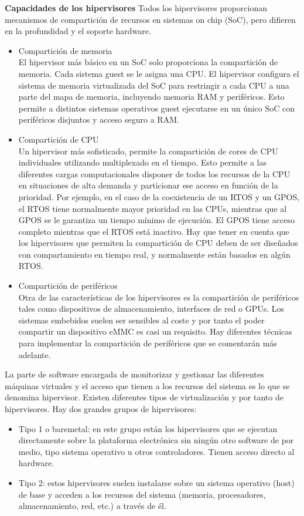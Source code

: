 \textbf{Capacidades de los hipervisores}
Todos los hipervisores proporcionan mecanismos de compartición de recursos en sistemas on chip (SoC), pero difieren en la profundidad y el soporte hardware.
\begin{itemize}
	\item Compartición de memoria\\
	El hipervisor más básico en un SoC solo proporciona la compartición de memoria. Cada sistema guest se le asigna una CPU. El hipervisor configura el sistema de memoria virtualizada del SoC para restringir a cada CPU a una parte del mapa de memoria, incluyendo memoria RAM y periféricos. Esto permite a distintos sistemas operativos guest ejecutarse en un único SoC con periféricos disjuntos y acceso seguro a RAM.
	\item Compartición de CPU\\
	Un hipervisor más sofisticado, permite la compartición de cores de CPU individuales utilizando multiplexado en el tiempo. Esto permite a las diferentes cargas computacionales disponer de todos los recursos de la CPU en situaciones de alta demanda y particionar ese acceso en función de la prioridad. Por ejemplo, en el caso de la coexistencia de un RTOS y un GPOS, el RTOS tiene normalmente mayor prioridad en las CPUs, mientras que al GPOS se le garantiza un tiempo mínimo de ejecución. El GPOS tiene acceso completo mientras que el RTOS está inactivo. Hay que tener en cuenta que los hipervisores que permiten la compartición de CPU deben de ser diseñados con compartamiento en tiempo real, y normalmente están basados en algún RTOS.
	\item Compartición de periféricos\\
	Otra de las características de los hipervisores es la compartición de periféricos tales como dispositivos de almacenamiento, interfaces de red o GPUs. Los sistemas embebidos suelen ser sensibles al coste y por tanto el poder compartir un dispositivo eMMC es casi un requisito. Hay diferentes técnicas para implementar la compartición de periféricos que se comentarán más adelante.
\end{itemize}

 La parte de software encargada de
monitorizar y gestionar las diferentes máquinas virtuales y el acceso que tienen a los recursos del
sistema es lo que se denomina hipervisor.
Existen diferentes tipos de virtualización y por tanto de hipervisores. Hay dos grandes grupos de
hipervisores:
\begin{itemize}
\item Tipo 1 o baremetal: en este grupo están los hipervisores que se ejecutan directamente sobre
la plataforma electrónica sin ningún otro software de por medio, tipo sistema operativo u
otros controladores. Tienen acceso directo al hardware.
\item Tipo 2: estos hipervisores suelen instalarse sobre un sistema operativo (host) de base y
acceden a los recursos del sistema (memoria, procesadores, almacenamiento, red, etc.) a
través de él.
\end{itemize}
